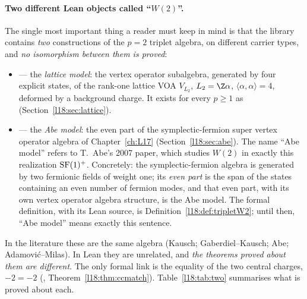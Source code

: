 \paragraph{Two different Lean objects called ``$W(2)$''.} The single most important thing a reader
must keep in mind is that the library contains \emph{two} constructions of the $p=2$ triplet
algebra, on different carrier types, and \emph{no isomorphism between them is proved}:
\begin{itemize}
\item {} --- the \emph{lattice model}: the vertex operator
  subalgebra, generated by four explicit states, of the rank-one lattice VOA $V_{L_2}$,
  $L_2=\Z\alpha$, $\langle\alpha,\alpha\rangle=4$, deformed by a background charge. It exists for
  every $p\ge1$ as  (Section~\ref{l18:sec:lattice}).
\item {} --- the \emph{Abe model}: the even part of the
  symplectic-fermion super vertex operator algebra of Chapter~\ref{ch:L17}
  (Section~\ref{l18:sec:abe}). The name ``Abe model'' refers to T.~Abe's 2007 paper, which studies
  $W(2)$ in exactly this realization $\mathrm{SF}(1)^+$. Concretely: the symplectic-fermion
  algebra is generated by two fermionic fields of weight one; its \emph{even part} is the span of
  the states containing an even number of fermion modes, and that even part, with its own vertex
  operator algebra structure, is the Abe model. The formal definition, with its Lean source, is
  Definition~\ref{l18:def:tripletW2}; until then, ``Abe model'' means exactly this sentence.
\end{itemize}
In the literature these are the same algebra (Kausch; Gaberdiel--Kausch; Abe; Adamovi\'c--Milas).
In Lean they are unrelated, and \emph{the theorems proved about them are different}. The only formal
link is the equality of the two central charges, $-2=-2$
(, Theorem~\ref{l18:thm:ccmatch}). Table~\ref{l18:tab:two}
summarises what is proved about each.

